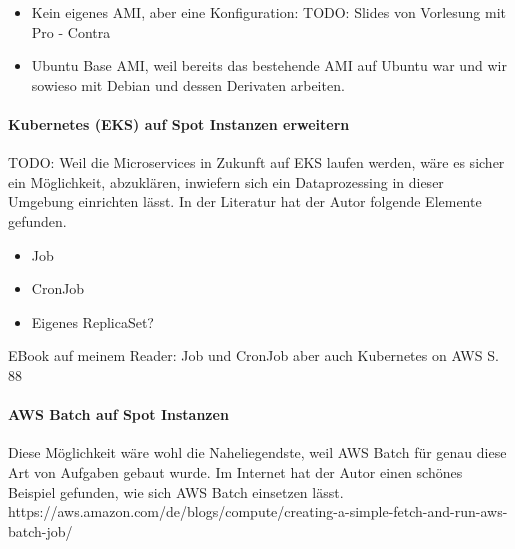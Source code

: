 \begin{itemize}
\item Kein eigenes AMI, aber eine Konfiguration: TODO: Slides von Vorlesung mit Pro - Contra
\item Ubuntu Base AMI, weil bereits das bestehende AMI auf Ubuntu war und wir sowieso mit Debian und dessen Derivaten arbeiten.
\end{itemize}


\paragraph{Kubernetes (EKS) auf Spot Instanzen erweitern}
TODO: Weil die Microservices in Zukunft auf EKS laufen werden, wäre es sicher ein Möglichkeit, abzuklären, inwiefern sich ein Dataprozessing in dieser Umgebung einrichten lässt. In der Literatur hat der Autor folgende Elemente gefunden.

\begin{itemize}
\item Job
\item CronJob
\item Eigenes ReplicaSet?
\end{itemize}

EBook auf meinem Reader: Job und CronJob aber auch Kubernetes on AWS S. 88

\paragraph{AWS Batch auf Spot Instanzen}
Diese Möglichkeit wäre wohl die Naheliegendste, weil AWS Batch für genau diese Art von Aufgaben gebaut wurde. Im Internet hat der Autor einen schönes Beispiel gefunden, wie sich AWS Batch einsetzen lässt.
https://aws.amazon.com/de/blogs/compute/creating-a-simple-fetch-and-run-aws-batch-job/

